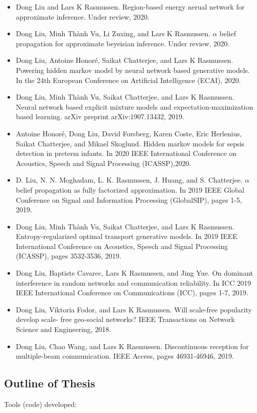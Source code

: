 \begin{itemize}
\item Dong Liu and Lars K Rasmussen. Region-based energy nerual network for approximate
inference. Under review, 2020.
\item Dong Liu, Minh Th\`{a}nh Vu, Li Zuxing, and Lars K Rasmussen. $\alpha$ belief propagation for approximate beyeisian inference. Under review, 2020.

\item Dong Liu, Antoine Honor{\'e}, Saikat Chatterjee, and Lars K Rasmussen. Powering hidden
markov model by neural network based generative models. In the 24th European Conference on Artificial Intelligence (ECAI), 2020.

\item Dong Liu, Minh Th\`{a}nh Vu, Saikat Chatterjee, and Lars K Rasmussen. Neural network
based explicit mixture models and expectation-maximization based learning. arXiv preprint
arXiv:1907.13432, 2019.

\item Antoine Honor{\'e}, Dong Liu, David Forsberg, Karen Coste, Eric Herlenius, Saikat Chatterjee, and Mikael Skoglund. Hidden markov models for sepsis detection in preterm infants. In 2020 IEEE International Conference on Acoustics, Speech and Signal Processing (ICASSP),2020.

\item D. Liu, N. N. Moghadam, L. K. Rasmussen, J. Huang, and S. Chatterjee. $\alpha$ belief propagation as fully factorized approximation. In 2019 IEEE Global Conference on Signal and Information Processing (GlobalSIP), pages 1-5, 2019.

\item Dong Liu, Minh Th\`{a}nh Vu, Saikat Chatterjee, and Lars K Rasmussen. Entropy-regularized
optimal transport generative models. In 2019 IEEE International Conference on Acoustics,
Speech and Signal Processing (ICASSP), pages 3532-3536, 2019.

\item Dong Liu, Baptiste Cavarec, Lars K Rasmussen, and Jing Yue. On dominant interference in random networks and communication reliability. In ICC 2019 IEEE International Conference on Communications (ICC), pages 1-7, 2019. 
\item Dong Liu, Viktoria Fodor, and Lars K Rasmussen. Will scale-free popularity develop scale-
free geo-social networks? IEEE Transactions on Network Science and Engineering, 2018.

\item Dong Liu, Chao Wang, and Lars K Rasmussen. Discontinuous reception for multiple-beam communication. IEEE Access, pages 46931-46946, 2019.
\end{itemize}

\subsection{Outline of Thesis}

Tools (code) developed:


